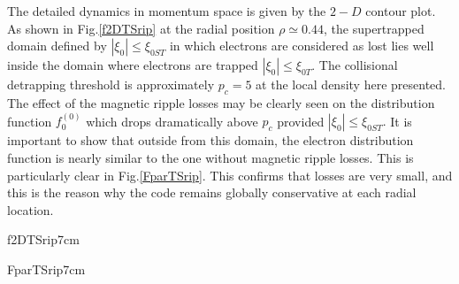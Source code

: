 The detailed dynamics in momentum space is given by the $2-D$ contour plot.
As shown in Fig.\ref{f2DTSrip} at the radial position $\rho \simeq 0.44$,
the supertrapped domain defined by $\left| \xi _{0}\right| \leq \xi _{0ST}$
in which electrons are considered as lost lies well inside the domain where
electrons are trapped $\left| \xi _{0}\right| \leq \xi _{0T}$. The
collisional detrapping threshold is approximately $p_{c}=5$ at the local
density here presented. The effect of the magnetic ripple losses may be
clearly seen on the distribution function $f_{0}^{\left( 0\right) }$ which
drops dramatically above $p_{c}$ provided $\left| \xi _{0}\right| \leq \xi
_{0ST}.$ It is important to show that outside from this domain, the electron
distribution function is nearly similar to the one without magnetic ripple
losses. This is particularly clear in Fig.\ref{FparTSrip}. This confirms
that losses are very small, and this is the reason why the code remains
globally conservative at each radial location.

{f2DTSrip}{7cm} %

{FparTSrip}{7cm} %
